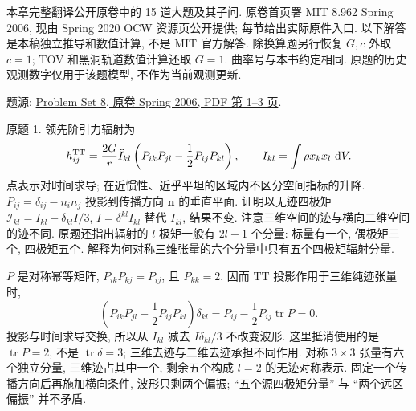 本章完整翻译公开原卷中的 15 道大题及其子问. 原卷首页署 MIT 8.962 Spring 2006, 现由 Spring 2020 OCW 资源页公开提供; 每节给出实际原件入口. 以下解答是本稿独立推导和数值计算, 不是 MIT 官方解答. 除换算题另行恢复 $G,c$ 外取 $c=1$; TOV 和黑洞轨道数值计算还取 $G=1$. 曲率号与本书约定相同. 原题的历史观测数字仅用于该题模型, 不作为当前观测更新.

题源: \href{https://ocw.mit.edu/courses/8-962-general-relativity-spring-2020/resources/mit8_962s20_pset08/}{Problem Set 8, 原卷 Spring 2006, PDF 第 1--3 页}.

\begin{exercise}\label{ps:8.1}
原题 1. 领先阶引力辐射为
\[
h^{\rm TT}_{ij}=\frac{2G}{r}\ddot I_{kl}\left(P_{ik}P_{jl}-\frac12P_{ij}P_{kl}\right),\qquad
I_{kl}=\int \rho x_kx_l\,\,\mathrm d V.
\]
点表示对时间求导; 在近惯性、近乎平坦的区域内不区分空间指标的升降. $P_{ij}=\delta_{ij}-n_in_j$ 投影到传播方向 $\boldsymbol n$ 的垂直平面. 证明以无迹四极矩 $\mathcal I_{kl}=I_{kl}-\delta_{kl}I/3$, $I=\delta^{kl}I_{kl}$ 替代 $I_{kl}$, 结果不变. 注意三维空间的迹与横向二维空间的迹不同. 原题还指出辐射的 $l$ 极矩一般有 $2l+1$ 个分量: 标量有一个, 偶极矩三个, 四极矩五个. 解释为何对称三维张量的六个分量中只有五个四极矩辐射分量.
\end{exercise}
\begin{solution}
$P$ 是对称幂等矩阵, $P_{ik}P_{kj}=P_{ij}$, 且 $P_{kk}=2$. 因而 TT 投影作用于三维纯迹张量时,
\[
\left(P_{ik}P_{jl}-\frac12P_{ij}P_{kl}\right)\delta_{kl}
=P_{ij}-\frac12P_{ij}\operatorname{tr}P=0.
\]
投影与时间求导交换, 所以从 $I_{kl}$ 减去 $I\delta_{kl}/3$ 不改变波形. 这里抵消使用的是 $\operatorname{tr}P=2$, 不是 $\operatorname{tr}\delta=3$; 三维去迹与二维去迹承担不同作用. 对称 $3\times3$ 张量有六个独立分量, 三维迹占其中一个, 剩余五个构成 $l=2$ 的无迹对称表示. 固定一个传播方向后再施加横向条件, 波形只剩两个偏振; ``五个源四极矩分量'' 与 ``两个远区偏振'' 并不矛盾.
\end{solution}

